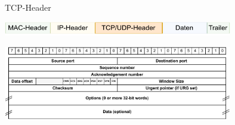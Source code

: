\begin{defi}{TCP-Header}
    \begin{center}
        \includegraphics[width=0.75\textwidth]{includes/figures/defi_tcp_header_kapselung.pdf}

        \includegraphics[width=0.75\textwidth]{includes/figures/defi_tcp_header.pdf}
    \end{center}
\end{defi}


